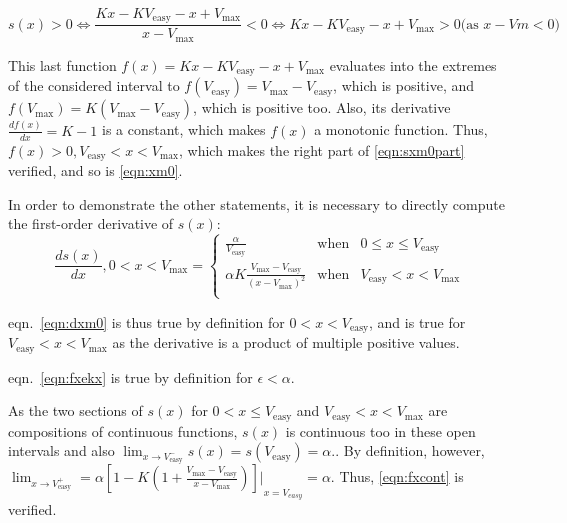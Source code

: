 \begin{equation} \label{eqn:sxm0part}
  s(x) > 0 \Leftrightarrow \frac{Kx - KV_{\text{easy}} - x + V_{\text{max}}}{x-V_{\text{max}}} <
  0 \Leftrightarrow Kx-KV_{\text{easy}} -x + V_{\text{max}} > 0 \text{(as } x-Vm < 0 \text{)}
\end{equation}

This last function $f(x) = Kx - KV_{\text{easy}} - x + V_{\text{max}}$ evaluates into the
extremes of the considered interval to $f(V_{\text{easy}}) = V_{\text{max}}-V_{\text{easy}}$, which is positive, and $f(V_{\text{max}}) = K(V_{\text{max}}-V_{\text{easy}})$,
which is positive too. Also, its derivative $\frac{df(x)}{dx}=K-1$ is
a constant, which makes $f(x)$ a monotonic function. Thus, $f(x)>0,
V_{\text{easy}} < x < V_{\text{max}}$, which makes the
right part of \ref{eqn:sxm0part} verified, and so is \ref{eqn:xm0}.

In order to demonstrate the other statements, it is necessary to directly compute the first-order derivative of $s(x)$:
\begin{equation}
  \frac{ds(x)}{dx}, 0 < x < V_{\text{max}}=\left\{
    \begin{array}{lcr}
      \frac{\alpha}{V_{\text{easy}}} & \text{when} & 0 \leq x \leq V_{\text{easy}} \\
      \alpha K \frac{V_{\text{max}}-V_{\text{easy}}}{{\left(x-V_{\text{max}}\right)}^2}
      & \text{when} &  V_{\text{easy}} < x < V_{\text{max}} \\
    \end{array} \right.
\end{equation}

eqn.~\ref{eqn:dxm0} is thus true by definition for $0 < x <
V_{\text{easy}}$, and is true for $ V_{\text{easy}} < x <
V_{\text{max}}$ as the derivative is a product of multiple positive
values.

eqn.~\ref{eqn:fxekx} is true by definition for $\epsilon<\alpha$.

As the two sections of $s(x)$ for $0<x\leq V_{\text{easy}}$ and
$V_{\text{easy}} < x < V_{\text{max}}$ are compositions of continuous
functions, $s(x)$ is continuous too in these open intervals and also
$\lim_{x\rightarrow V_{\text{easy}}^-} s(x) = s(V_{\text{easy}})
= \alpha .$. By
definition, however,
$\lim_{x\rightarrow V_{\text{easy}}^+} =
{ {
      \alpha \left[1-K\left(1+\frac{V_{\text{max}}-V_{\text{easy}}}{x-V_{\text{max}}}\right)\right]} \rvert}_{x=V_{easy}}
      = \alpha$. Thus, \ref{eqn:fxcont} is verified.

